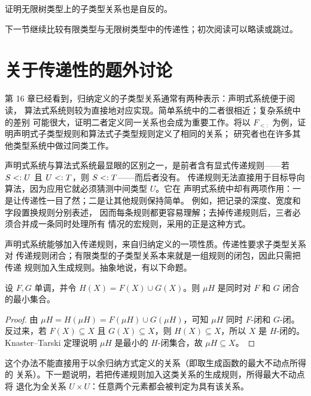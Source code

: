 \begin{exercise}
\label{ex:21.3.8}
证明无限树类型上的子类型关系也是自反的。
\end{exercise}

下一节继续比较有限类型与无限树类型中的传递性；初次阅读可以略读或跳过。

\section{关于传递性的题外讨论}
\label{sec:21.4}

第 16 章已经看到，归纳定义的子类型关系通常有两种表示：声明式系统便于阅读，
算法式系统则较为直接地对应实现。简单系统中的二者很相近；复杂系统中的差别
可能很大，证明二者定义同一关系也会成为重要工作。将以
\(F_{<:}\) 为例，证明声明式子类型规则和算法式子类型规则定义了相同的关系；
研究者也在许多其他类型系统中做过同类工作。

声明式系统与算法式系统最显眼的区别之一，是前者含有显式传递规则——若
\(S\mathrel{<:} U\) 且 \(U\mathrel{<:} T\)，则 \(S\mathrel{<:} T\)——而后者没有。
传递规则无法直接用于目标导向算法，因为应用它就必须猜测中间类型 \(U\)。它在
声明式系统中却有两项作用：一是让传递性一目了然；二是让其他规则保持简单。
例如，把记录的深度、宽度和字段置换规则分别表述，
因而每条规则都更容易理解；去掉传递规则后，三者必须合并成一条同时处理所有
情况的宏规则，采用的正是这种方式。

声明式系统能够加入传递规则，来自归纳定义的一项性质。传递性要求子类型关系对
传递规则闭合；有限类型的子类型关系本来就是一组规则的闭包，因此只需把传递
规则加入生成规则。抽象地说，有以下命题。

\begin{proposition}
\label{prop:21.4.1}
设 \(F,G\) 单调，并令 \(H(X)=F(X)\cup G(X)\)。则 \(\mu H\) 是同时对
\(F\) 和 \(G\) 闭合的最小集合。
\end{proposition}

\begin{proof}
由 \(\mu H=H(\mu H)=F(\mu H)\cup G(\mu H)\)，可知 \(\mu H\) 同时
\(F\)-闭和 \(G\)-闭。反过来，若 \(F(X)\subseteq X\) 且
\(G(X)\subseteq X\)，则 \(H(X)\subseteq X\)，所以 \(X\) 是 \(H\)-闭的。
Knaster--Tarski 定理说明 \(\mu H\) 是最小的 \(H\)-闭集合，故
\(\mu H\subseteq X\)。
\end{proof}

这个办法不能直接用于以余归纳方式定义的关系（即取生成函数的最大不动点所得的
关系）。下一题说明，若把传递规则加入这类关系的生成规则，所得最大不动点将
退化为全关系 \(U\times U\)：任意两个元素都会被判定为具有该关系。

